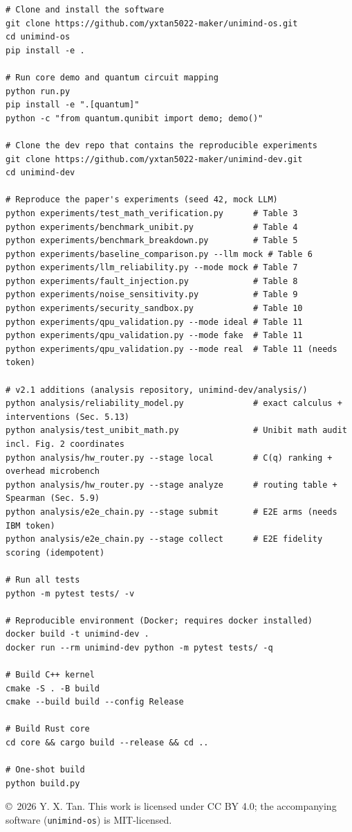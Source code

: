 ﻿\documentclass[12pt,a4paper]{article}
\begin{document}
\begingroup
\footnotesize
\begin{verbatim}
# Clone and install the software
git clone https://github.com/yxtan5022-maker/unimind-os.git
cd unimind-os
pip install -e .

# Run core demo and quantum circuit mapping
python run.py
pip install -e ".[quantum]"
python -c "from quantum.qunibit import demo; demo()"

# Clone the dev repo that contains the reproducible experiments
git clone https://github.com/yxtan5022-maker/unimind-dev.git
cd unimind-dev

# Reproduce the paper's experiments (seed 42, mock LLM)
python experiments/test_math_verification.py      # Table 3
python experiments/benchmark_unibit.py            # Table 4
python experiments/benchmark_breakdown.py         # Table 5
python experiments/baseline_comparison.py --llm mock # Table 6
python experiments/llm_reliability.py --mode mock # Table 7
python experiments/fault_injection.py             # Table 8
python experiments/noise_sensitivity.py           # Table 9
python experiments/security_sandbox.py            # Table 10
python experiments/qpu_validation.py --mode ideal # Table 11
python experiments/qpu_validation.py --mode fake  # Table 11
python experiments/qpu_validation.py --mode real  # Table 11 (needs token)

# v2.1 additions (analysis repository, unimind-dev/analysis/)
python analysis/reliability_model.py              # exact calculus + interventions (Sec. 5.13)
python analysis/test_unibit_math.py               # Unibit math audit incl. Fig. 2 coordinates
python analysis/hw_router.py --stage local        # C(q) ranking + overhead microbench
python analysis/hw_router.py --stage analyze      # routing table + Spearman (Sec. 5.9)
python analysis/e2e_chain.py --stage submit       # E2E arms (needs IBM token)
python analysis/e2e_chain.py --stage collect      # E2E fidelity scoring (idempotent)

# Run all tests
python -m pytest tests/ -v

# Reproducible environment (Docker; requires docker installed)
docker build -t unimind-dev .
docker run --rm unimind-dev python -m pytest tests/ -q

# Build C++ kernel
cmake -S . -B build
cmake --build build --config Release

# Build Rust core
cd core && cargo build --release && cd ..

# One-shot build
python build.py
\end{verbatim}
\endgroup

\vfill
\begin{center}
\small\copyright\ 2026 Y. X. Tan. This work is licensed under CC BY 4.0; the accompanying software (\texttt{unimind-os}) is MIT-licensed.
\end{center}
\end{document}
